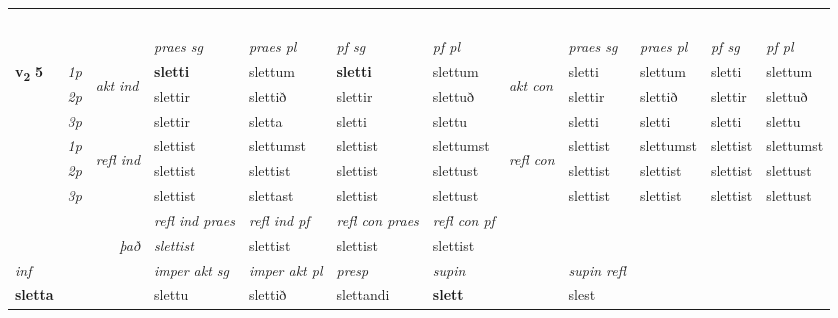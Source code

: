 \begin{longtable}[l]{X>{\footnotesize\itshape}llXXXXlXXXX}
\midrule
& \\*
& \\*
& \\*
& \\*
& \\
   \midrule
 & &   & \textit{praes sg}  & \textit{praes pl}    & \textit{ pf sg} & \textit{pf pl} & & \textit{praes sg}  & \textit{praes pl}    & \textit{pf sg} & \textit{pf pl }  \\ \cmidrule{4-7} \cmidrule{9-12}
 \multirow{2}{*}{{{\textbf{v{\textsubscript{2}}} \Large{\textbf{5}}}}}  & 1p & \multirow{3}{*}{\begin{turn}{90}\textit{akt ind}\end{turn}} & \textbf{sletti} & slettum & \textbf{sletti} & slettum & \multirow{3}{*}{\begin{turn}{90}\textit{akt con}\end{turn}} &sletti & slettum & sletti & slettum\\*
 & 2p &  &  slettir  & slettið & slettir & slettuð & & slettir & slettið & slettir & slettuð \\*
 & 3p &  & slettir & sletta & sletti & slettu & & sletti & sletti& sletti & slettu \\*
\cmidrule{4-7} \cmidrule{9-12}
 & 1p & \multirow{3}{*}{\begin{turn}{90}\textit{refl ind}\end{turn}}  & slettist & slettumst & slettist & slettumst & \multirow{3}{*}{\begin{turn}{90}\textit{refl con}\end{turn}}  &slettist & slettumst & slettist & slettumst \\*
 & 2p &  & slettist & slettist & slettist & slettust & &slettist & slettist & slettist & slettust \\*
 & 3p  & & slettist & slettast & slettist & slettust & & slettist & slettist& slettist & slettust \\*
\cmidrule{4-7} \cmidrule{9-12}

 & && \textit{refl ind praes} & \textit{refl ind pf} & \textit{refl con praes} & \textit{refl con pf} \\*
\multicolumn{3}{r}{\textit{það}}& slettist & slettist & slettist & slettist \\*

\cmidrule{4-7}
   {\textit{inf}} & &  & \textit{imper akt sg} & \textit{imper akt pl}   & \textit{presp} & \textit{supin} && \textit{supin refl}  \\*
  {\textbf{sletta}} & && slettu  & slettið   & slettandi &  \textbf{slett} && slest  \\*


\end{longtable}
